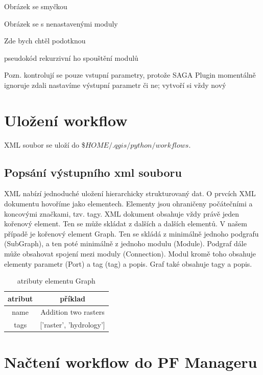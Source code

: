 Obrázek se smyčkou

Obrázek se s nenastavenými moduly

Zde bych chtěl podotknou 

{\color{red} pseudokód rekurzivní ho spouštění modulů}

Pozn. kontrolují se pouze vstupní parametry, protože SAGA Plugin momentálně ignoruje zdali nastavíme výstupní parametr či ne; vytvoří si vždy nový

\section{Uložení workflow}
XML soubor se uloží do \$$HOME/.qgis/python/workflows$. 
\subsection{Popsání výstupního xml souboru}
XML nabízí jednoduché uložení hierarchicky strukturovaný dat. O prvcích XML dokumentu hovoříme jako elementech. Elementy jsou ohraničeny počátečními a koncovými značkami, tzv. tagy. XML dokument obsahuje vždy právě jeden kořenový element. Ten se může skládat z dalších a dalších elementů. V našem případě je kořenový element Graph. Ten se skládá z minimálně jednoho podgrafu (SubGraph), a ten poté minimálně z jednoho modulu (Module). Podgraf dále může obsahovat spojení mezi moduly (Connection). Modul kromě toho obsahuje elementy parametr (Port) a tag (tag) a popis. Graf také obsahuje tagy a popis. 

\begin{table}	
	\centering
	\begin{tabular}{|c|c|}
		\hline
		atribut & příklad \\
		\hline
		name & Addition two rasters \\
		tags & ['raster', 'hydrology'] \\	
		\hline	
	\end{tabular}
	\caption{atributy elementu Graph}
	\label{tab:graph}
\end{table}

\section{Načtení workflow do PF Manageru}
